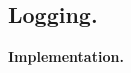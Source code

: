 
\pagebreak
\begin{center}
\section*{Logging.}
\end{center}

\medskip


\textbf{Implementation.}




